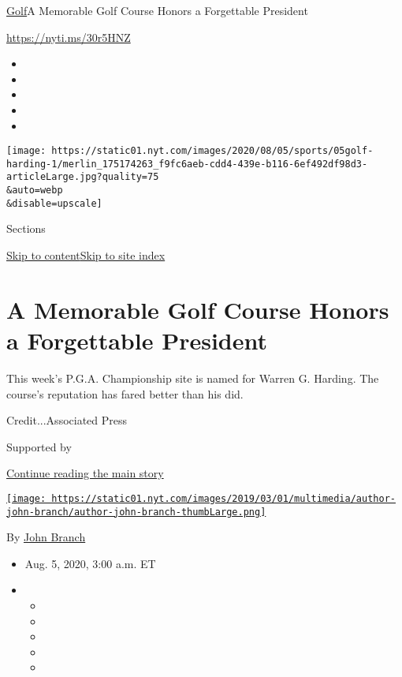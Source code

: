 \href{/section/sports/golf}{Golf}\textbar{}A Memorable Golf Course
Honors a Forgettable President

\url{https://nyti.ms/30r5HNZ}

\begin{itemize}
\item
\item
\item
\item
\item
\end{itemize}

\texttt{[image: https://static01.nyt.com/images/2020/08/05/sports/05golf-harding-1/merlin\_175174263\_f9fc6aeb-cdd4-439e-b116-6ef492df98d3-articleLarge.jpg?quality=75\\\&auto=webp\\\&disable=upscale]}

Sections

\protect\hyperlink{site-content}{Skip to
content}\protect\hyperlink{site-index}{Skip to site index}

\hypertarget{a-memorable-golf-course-honors-a-forgettable-president}{%
\section{A Memorable Golf Course Honors a Forgettable
President}\label{a-memorable-golf-course-honors-a-forgettable-president}}

This week's P.G.A. Championship site is named for Warren G. Harding. The
course's reputation has fared better than his did.

Credit...Associated Press

Supported by

\protect\hyperlink{after-sponsor}{Continue reading the main story}

\href{https://www.nytimes.com/by/john-branch}{\texttt{[image: https://static01.nyt.com/images/2019/03/01/multimedia/author-john-branch/author-john-branch-thumbLarge.png]}}

By \href{https://www.nytimes.com/by/john-branch}{John Branch}

\begin{itemize}
\item
  Aug. 5, 2020, 3:00 a.m. ET
\item
  \begin{itemize}
  \item
  \item
  \item
  \item
  \item
  \end{itemize}
\end{itemize}

